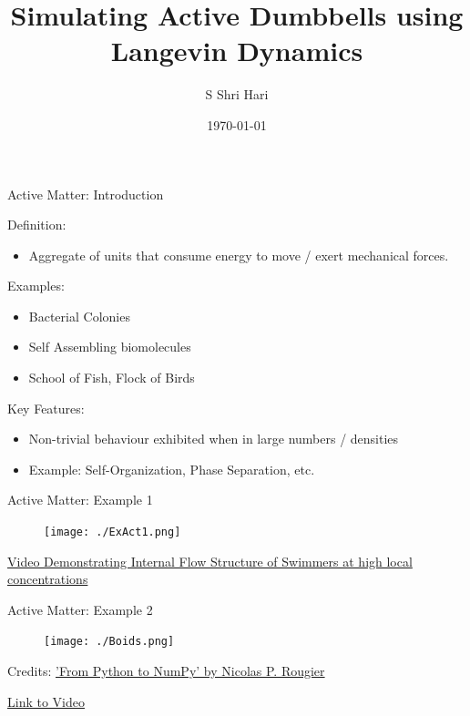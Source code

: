 \documentclass[10pt]{beamer}
\author{S Shri Hari}
\date{\today}
\title{Simulating Active Dumbbells using Langevin Dynamics}
\begin{document}
\maketitle




\begin{frame}[label={sec:orgbab2fe4}]{Active Matter: Introduction}
\begin{block}{Definition:}
\begin{itemize}
\item Aggregate of units that consume energy to move / exert mechanical forces.
\end{itemize}
\end{block}
\begin{block}{Examples:}
\begin{itemize}
\item Bacterial Colonies
\item Self Assembling biomolecules
\item School of Fish, Flock of Birds
\end{itemize}
\end{block}
\begin{block}{Key Features:}
\begin{itemize}
\item Non-trivial behaviour exhibited when in large numbers / densities
\item Example: Self-Organization, Phase Separation, etc.
\end{itemize}
\end{block}
\end{frame}

\begin{frame}[label={sec:orgff9ddea}]{Active Matter: Example 1}
\begin{figure}[htbp]
\centering
\texttt{[image: ./ExAct1.png]}
\end{figure}

\href{https://www.youtube.com/watch?v=j6dBq0F12nY}{Video Demonstrating Internal Flow Structure of Swimmers at high local concentrations}
\end{frame}

\begin{frame}[label={sec:orgd84b9b8}]{Active Matter: Example 2}
\begin{figure}[htbp]
\centering
\texttt{[image: ./Boids.png]}
\end{figure}

Credits: \href{https://www.labri.fr/perso/nrougier/from-python-to-numpy/#spatial-vectorization}{'From Python to NumPy' by Nicolas P. Rougier}

\href{./Boids.mp4}{Link to Video}
\end{frame}
\end{document}
